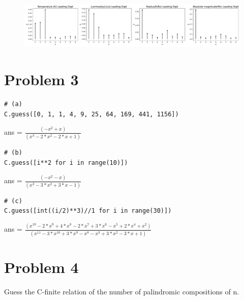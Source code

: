 \documentclass{article}
\begin{document}
		
\begin{figure}[H]
	\centering
	\includegraphics[width=1\linewidth]{../drawings/p2_subplots.pdf}
\end{figure}


\pagebreak
\section*{Problem 3}

\begin{multicols}{2}


\begin{lstlisting}
# (a)
C.guess([0, 1, 1, 4, 9, 25, 64, 169, 441, 1156]) 
\end{lstlisting}
ans = $\frac{(-x^2 + x)}{(x^3 - 2*x^2 - 2*x + 1)}$


\begin{lstlisting}
# (b)
C.guess([i**2 for i in range(10)]) 
\end{lstlisting}
ans = $\frac{(-x^2 - x)}{(x^3 - 3*x^2 + 3*x - 1)}$
\\
\columnbreak

\begin{lstlisting}
# (c)
C.guess([int((i/2)**3)//1 for i in range(30)]) 
\end{lstlisting}
ans = $\frac{(x^10 - 2*x^9 + 4*x^8 - 2*x^7 + 3*x^6 - x^5 + 2*x^4 + x^2)}{(x^11 - 3*x^10 + 3*x^9 - x^8 - x^3 + 3*x^2 - 3*x + 1)}$

\noindent


\end{multicols}

\section*{Problem 4}
Guess the C-finite relation of the number of palindromic compositions of n.
\vspace{10pt}
\end{document}

